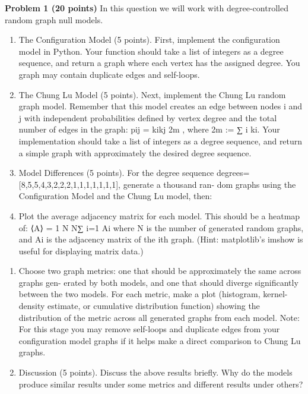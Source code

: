 \documentclass[11pt]{article}
\begin{document}
\begin{problemstmt}
\textbf{Problem 1 (20 points)} In this question we will work with
degree-controlled random graph null models.

\begin{enumerate}
\def\labelenumi{(\alph{enumi})}
\item
  The Configuration Model (5 points). First, implement the configuration
  model in Python. Your function should take a list of integers as a
  degree sequence, and return a graph where each vertex has the assigned
  degree. You graph may contain duplicate edges and self-loops.
\item
  The Chung Lu Model (5 points). Next, implement the Chung Lu random
  graph model. Remember that this model creates an edge between nodes i
  and j with independent probabilities defined by vertex degree and the
  total number of edges in the graph: pij = kikj 2m , where 2m := ∑︁ i
  ki. Your implementation should take a list of integers as a degree
  sequence, and return a simple graph with approximately the desired
  degree sequence.
\item
  Model Differences (5 points). For the degree sequence
  degrees={[}8,5,5,4,3,2,2,2,1,1,1,1,1,1,1{]}, generate a thousand ran-
  dom graphs using the Configuration Model and the Chung Lu model, then:
\item
  Plot the average adjacency matrix for each model. This should be a
  heatmap of: ⟨A⟩ = 1 N N∑︂ i=1 Ai where N is the number of generated
  random graphs, and Ai is the adjacency matrix of the ith graph. (Hint:
  matplotlib's imshow is useful for displaying matrix data.)
\end{enumerate}

\begin{enumerate}
\def\labelenumi{(\roman{enumi})}
\setcounter{enumi}{1}
\item
  Choose two graph metrics: one that should be approximately the same
  across graphs gen- erated by both models, and one that should diverge
  significantly between the two models. For each metric, make a plot
  (histogram, kernel-density estimate, or cumulative distribution
  function) showing the distribution of the metric across all generated
  graphs from each model. Note: For this stage you may remove self-loops
  and duplicate edges from your configuration model graphs if it helps
  make a direct comparison to Chung Lu graphs.
\item
  Discussion (5 points). Discuss the above results briefly. Why do the
  models produce similar results under some metrics and different
  results under others?
\end{enumerate}
\end{problemstmt}
\end{document}
